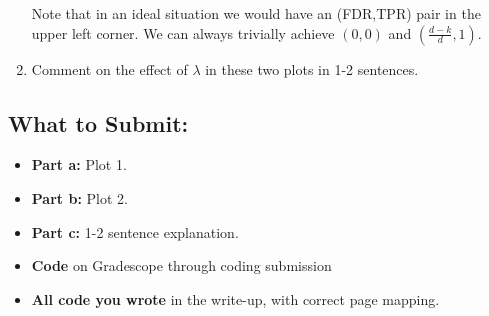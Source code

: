 \documentclass{article}
\begin{document}
\begin{aprob}
\begin{enumerate}
        Note that in an ideal situation we would have an (FDR,TPR) pair in the upper left corner. We can always trivially achieve $(0,0)$ and $(\tfrac{d-k}{d},1)$.
          
        \item {} Comment on the effect of $\lambda$ in these two plots in 1-2 sentences.
  \end{enumerate}
  
  \subsection*{What to Submit:}
    \begin{itemize}
        \item \textbf{Part a:} Plot 1.
        \item \textbf{Part b:} Plot 2.
        \item \textbf{Part c:} 1-2 sentence explanation.
        \item \textbf{Code} on Gradescope through coding submission
        \item \textbf{All code you wrote} in the write-up, with correct page mapping.
    \end{itemize}
  \end{aprob}
  
\end{document}
